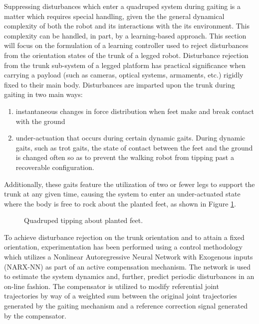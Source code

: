 		Suppressing disturbances which enter a quadruped system during gaiting is a matter which requires special handling, given the the general dynamical complexity of both the robot and its interactions with the its environment. This complexity can be handled, in part, by a learning-based approach. This section will focus on the formulation of a learning controller used to reject disturbances from the orientation states of the trunk of a legged robot. Disturbance rejection from the trunk sub-system of a legged platform has practical significance when carrying a payload (such as cameras, optical systems, armaments, etc.) rigidly fixed to their main body. Disturbances are imparted upon the trunk during gaiting in two main ways: 
		\begin{enumerate}
			\item instantaneous changes in force distribution when feet make and break contact with the ground 
			\item under-actuation that occurs during certain dynamic gaits. During dynamic gaits, such as trot gaits, the state of contact between the feet and the ground is changed often so as to prevent the walking robot from tipping past a recoverable configuration. 
			\end{enumerate}
		Additionally, these gaits feature the utilization of two or fewer legs to support the trunk at any given time, causing the system to enter an under-actuated state where the body is free to rock about the planted feet, as shown in Figure \ref{fig::quadruped_walking}.
			\begin{figure}[h!]
			\centering
				\caption{ Quadruped tipping about planted feet. }
				\label{fig::quadruped_walking}
			\end{figure}
		To achieve disturbance rejection on the trunk orientation and to attain a fixed orientation, experimentation has been performed using a control methodology which utilizes a Nonlinear Autoregressive Neural Network with Exogenous inputs (NARX-NN) as part of an active compensation mechanism. The network is used to estimate the system dynamics and, further, predict periodic disturbances in an on-line fashion. The compensator is utilized to modify referential joint trajectories by way of a weighted sum between the original joint trajectories generated by the gaiting mechanism and a reference correction signal generated by the compensator.

